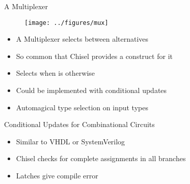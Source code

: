 \begin{frame}[fragile]{A Multiplexer}
\begin{figure}
  \texttt{[image: ../figures/mux]}
\end{figure}
\begin{itemize}
\item A Multiplexer selects between alternatives
\item So common that Chisel provides a construct for it
\item Selects  when  is  otherwise 
\item Could be implemented with conditional updates
\item Automagical type selection on input types
\end{itemize}
\end{frame}

%

\begin{frame}[fragile]{Conditional Updates for Combinational Circuits}
\begin{itemize}
\item Similar to VHDL  or SystemVerilog 
\item Chisel checks for complete assignments in all branches
\item Latches give compile error
\end{itemize}
\end{frame}

